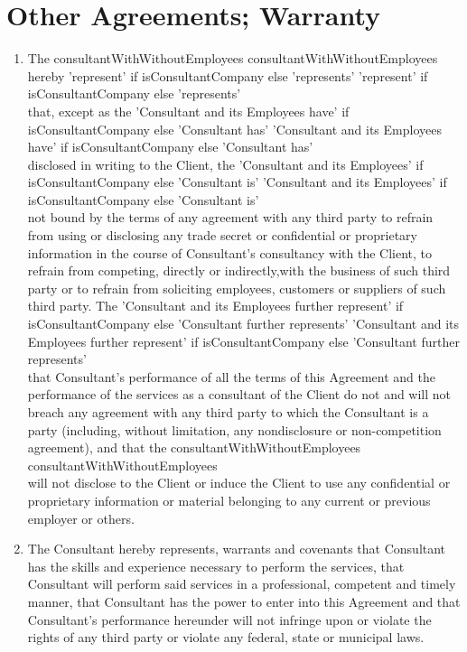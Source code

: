 \documentclass[10pt]{article}
\makeatletter
\edef\history{ }
\newcommand{\VAR}[1]{{\color{blue} #1}\g@addto@macro\history{#1\\}}
\makeatother
\begin{document}
\section{Other Agreements; Warranty}
\begin{enumerate}
    \item The \VAR{ consultantWithWithoutEmployees } hereby
    \VAR{ 'represent' if isConsultantCompany else 'represents'}
    that, except as the
    \VAR{ 'Consultant and its Employees have' if isConsultantCompany else 'Consultant has' }
    disclosed in writing to the Client, the
    \VAR{ 'Consultant and its Employees' if isConsultantCompany else 'Consultant is' }
    not bound by the terms of any agreement with any third party to refrain from using or disclosing any trade secret or confidential or proprietary information in the course of Consultant's consultancy with the Client, to refrain from competing, directly or indirectly,with the business of such third party or to refrain from soliciting employees, customers or suppliers of such third party. The
    \VAR{ 'Consultant and its Employees further represent' if isConsultantCompany else 'Consultant further represents' }
    that Consultant's performance of all the terms of this Agreement and the performance of the services as a consultant of the Client do not and will not breach any agreement with any third party to which the Consultant is a party (including, without limitation, any nondisclosure or non-competition agreement), and that the \VAR{consultantWithWithoutEmployees} will not disclose to the Client or induce the Client to use any confidential or proprietary information or material belonging to any current or previous employer or others.
    \item The Consultant hereby represents, warrants and covenants that Consultant has the skills and experience necessary to perform the services, that Consultant will perform said services in a professional, competent and timely manner, that Consultant has the power to enter into this Agreement and that Consultant's performance hereunder will not infringe upon or violate the rights of any third party or violate any federal, state or municipal laws.
\end{enumerate}
\end{document}
